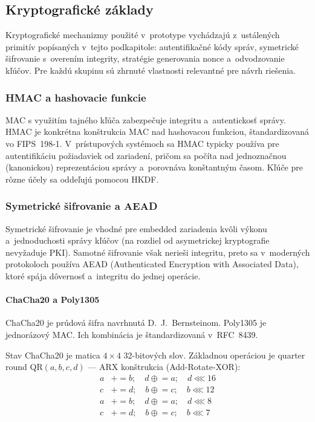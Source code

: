 
\subsection{Kryptografické základy}

Kryptografické mechanizmy použité v~prototype vychádzajú z~ustálených primitív popísaných v~tejto podkapitole: autentifikačné kódy správ, symetrické šifrovanie s~overením integrity, stratégie generovania nonce a~odvodzovanie kľúčov. Pre každú skupinu sú zhrnuté vlastnosti relevantné pre návrh riešenia.

\subsubsection{HMAC a hashovacie funkcie}

MAC s využitím tajného kľúča zabezpečuje integritu a~autentickosť správy. HMAC je konkrétna konštrukcia MAC nad hashovacou funkciou, štandardizovaná vo FIPS~198-1\cite{FIPS1981,RFC2104}. V~prístupových systémoch sa HMAC typicky používa pre autentifikáciu požiadaviek od zariadení, pričom sa počíta nad jednoznačnou (kanonickou) reprezentáciou správy a~porovnáva konštantným časom. Kľúče pre rôzne účely sa oddeľujú pomocou HKDF\cite{RFC5869}.

\subsubsection{Symetrické šifrovanie a AEAD}

Symetrické šifrovanie je vhodné pre embedded zariadenia kvôli výkonu a~jednoduchosti správy kľúčov (na rozdiel od asymetrickej kryptografie nevyžaduje PKI). Samotné šifrovanie však nerieši integritu, preto sa v~moderných protokoloch používa AEAD (Authenticated Encryption with Associated Data), ktoré spája dôvernosť a~integritu do jednej operácie.

\paragraph{ChaCha20 a Poly1305}

ChaCha20 je prúdová šifra navrhnutá D.~J.~Bernsteinom\cite{Bernstein2012}. Poly1305 je jednorázový MAC. Ich kombinácia je štandardizovaná v~RFC~8439\cite{RFC8439,RFC5116}.

Stav ChaCha20 je matica $4\times4$ 32-bitových slov. Základnou operáciou je quarter round QR$(a, b, c, d)$ --- ARX konštrukcia (Add-Rotate-XOR):
\begin{align}
a &\mathrel{+}= b;\quad d \mathrel{\oplus}= a;\quad d \lll 16 \nonumber \\
c &\mathrel{+}= d;\quad b \mathrel{\oplus}= c;\quad b \lll 12 \nonumber \\
a &\mathrel{+}= b;\quad d \mathrel{\oplus}= a;\quad d \lll 8  \nonumber \\
c &\mathrel{+}= d;\quad b \mathrel{\oplus}= c;\quad b \lll 7  \nonumber
\end{align}

